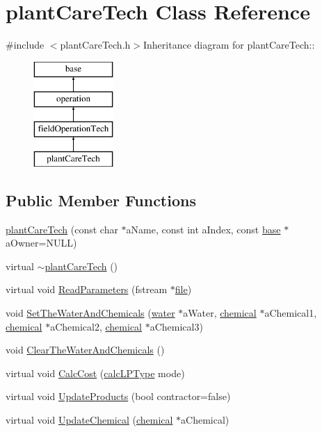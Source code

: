 \hypertarget{classplant_care_tech}{
\section{plantCareTech Class Reference}
\label{classplant_care_tech}
}


{\ttfamily \#include $<$plantCareTech.h$>$}Inheritance diagram for plantCareTech::\begin{figure}[H]
\begin{center}
\leavevmode
\includegraphics[height=4cm]{classplant_care_tech}
\end{center}
\end{figure}
\subsection*{Public Member Functions}
\begin{DoxyCompactItemize}
\item 
\hyperlink{classplant_care_tech_a833337d3d8b192ab21e01e17e0907490}{plantCareTech} (const char $\ast$aName, const int aIndex, const \hyperlink{classbase}{base} $\ast$aOwner=NULL)
\item 
virtual \hyperlink{classplant_care_tech_add340452926f3160e902f5789f7ca0d4}{$\sim$plantCareTech} ()
\item 
virtual void \hyperlink{classplant_care_tech_ac699023786b1759775d57e80b5817096}{ReadParameters} (fstream $\ast$\hyperlink{classbase_a3af52ee9891719d09b8b19b42450b6f6}{file})
\item 
void \hyperlink{classplant_care_tech_a55d4a7b94fdbb6f1d3533b2f5b4b20dc}{SetTheWaterAndChemicals} (\hyperlink{classwater}{water} $\ast$aWater, \hyperlink{classchemical}{chemical} $\ast$aChemical1, \hyperlink{classchemical}{chemical} $\ast$aChemical2, \hyperlink{classchemical}{chemical} $\ast$aChemical3)
\item 
void \hyperlink{classplant_care_tech_ab4b61e63f30a98eb3d877e928966272f}{ClearTheWaterAndChemicals} ()
\item 
virtual void \hyperlink{classplant_care_tech_aafaa089fe218f4a9edb91842404160e5}{CalcCost} (\hyperlink{typer_8h_af05cf854fc14086a0d6404be5ae9813f}{calcLPType} mode)
\item 
virtual void \hyperlink{classplant_care_tech_a877ed4e1f3d84637783c1ac0474a6bc6}{UpdateProducts} (bool contractor=false)
\item 
virtual void \hyperlink{classplant_care_tech_a99f5c674a3ae4cb85e1a56e2b3bb46cf}{UpdateChemical} (\hyperlink{classchemical}{chemical} $\ast$aChemical)
\end{DoxyCompactItemize}
